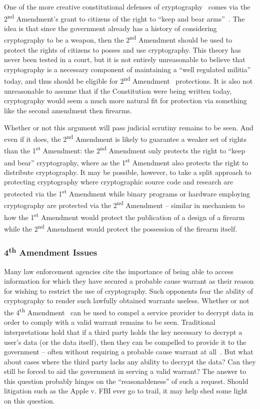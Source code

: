 One of the more creative constitutional defenses of
cryptography~\cite{xkcd-504} comes via the 2\textsuperscript{nd}
Amendment's grant to citizens of the right to ``keep and bear
arms''~\cite{us-constitution-amend2}. The idea is that since the
government already has a history of considering cryptography to be a
weapon, then the 2\textsuperscript{nd} Amendment should be used to
protect the rights of citizens to posses and use cryptography. This
theory has never been tested in a court, but it is not entirely
unreasonable to believe that cryptography is a necessary component of
maintaining a ``well regulated militia'' today, and thus should be
eligible for 2\textsuperscript{nd}
Amendment~\cite{scotus-usvmiller-guns} protections. It is also not
unreasonable to assume that if the Constitution were being written
today, cryptography would seem a much more natural fit for protection
via something like the second amendment then firearms.

Whether or not this argument will pass judicial scrutiny remains to be
seen. And even if it does, the 2\textsuperscript{nd} Amendment is
likely to guarantee a weaker set of rights than the
1\textsuperscript{st} Amendment: the 2\textsuperscript{nd} Amendment
only protects the right to ``keep and bear'' cryptography, where as
the 1\textsuperscript{st} Amendment also protects the right to
distribute cryptography. It may be possible, however, to take a split
approach to protecting cryptography where cryptographic source code
and research are protected via the 1\textsuperscript{st} Amendment
while binary programs or hardware employing cryptography are protected
via the 2\textsuperscript{nd} Amendment -- similar in mechanism to how
the 1\textsuperscript{st} Amendment would protect the publication of a
design of a firearm while the 2\textsuperscript{nd} Amendment would
protect the possession of the firearm itself.

\subsubsection{4\textsuperscript{th} Amendment Issues}

Many law enforcement agencies cite the importance of being able to
access information for which they have secured a probable cause
warrant as their reason for wishing to restrict the use of
cryptography. Such opponents fear the ability of cryptography to
render such lawfully obtained warrants useless. Whether or not the
4\textsuperscript{th} Amendment~\cite{us-constitution-amend4} can be
used to compel a service provider to decrypt data in order to comply
with a valid warrant remains to be seen. Traditional interpretations
hold that if a third party holds the key necessary to decrypt a user's
data (or the data itself), then they can be compelled to provide it to
the government -- often without requiring a probable cause warrant at
all~\cite{thompson-thirdparty}. But what about cases where the third
party lacks any ability to decrypt the data? Can they still be forced
to aid the government in serving a valid warrant?  The answer to this
question probably hinges on the ``reasonableness'' of such a
request. Should litigation such as the Apple v. FBI ever go to trail,
it may help shed some light on this question.

